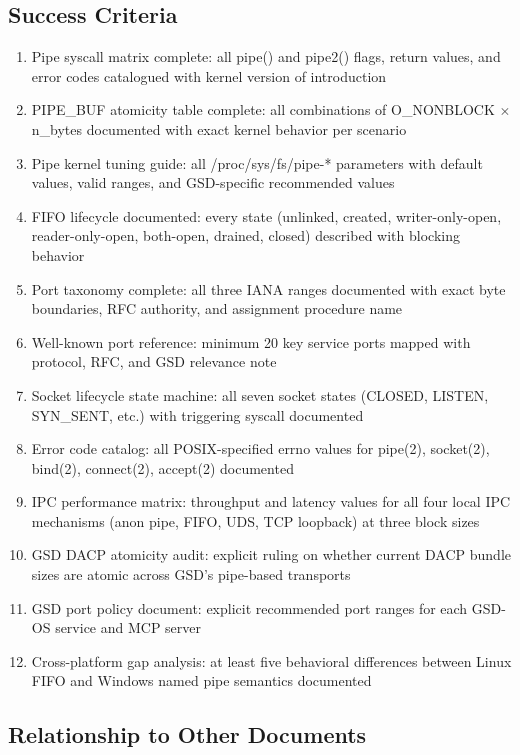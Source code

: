\documentclass[11pt,letterpaper]{article}
\begin{document}
\subsection{Success Criteria}

\begin{enumerate}
  \item Pipe syscall matrix complete: all pipe() and pipe2() flags, return values, and error codes catalogued with kernel version of introduction
  \item PIPE\_BUF atomicity table complete: all combinations of O\_NONBLOCK $\times$ n\_bytes documented with exact kernel behavior per scenario
  \item Pipe kernel tuning guide: all /proc/sys/fs/pipe-* parameters with default values, valid ranges, and GSD-specific recommended values
  \item FIFO lifecycle documented: every state (unlinked, created, writer-only-open, reader-only-open, both-open, drained, closed) described with blocking behavior
  \item Port taxonomy complete: all three IANA ranges documented with exact byte boundaries, RFC authority, and assignment procedure name
  \item Well-known port reference: minimum 20 key service ports mapped with protocol, RFC, and GSD relevance note
  \item Socket lifecycle state machine: all seven socket states (CLOSED, LISTEN, SYN\_SENT, etc.) with triggering syscall documented
  \item Error code catalog: all POSIX-specified errno values for pipe(2), socket(2), bind(2), connect(2), accept(2) documented
  \item IPC performance matrix: throughput and latency values for all four local IPC mechanisms (anon pipe, FIFO, UDS, TCP loopback) at three block sizes
  \item GSD DACP atomicity audit: explicit ruling on whether current DACP bundle sizes are atomic across GSD's pipe-based transports
  \item GSD port policy document: explicit recommended port ranges for each GSD-OS service and MCP server
  \item Cross-platform gap analysis: at least five behavioral differences between Linux FIFO and Windows named pipe semantics documented
\end{enumerate}

\subsection{Relationship to Other Documents}
\end{document}
